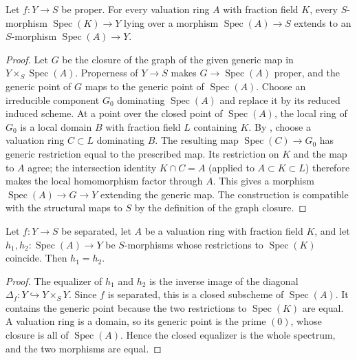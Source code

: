\begin{lemma}
  \label{lemma:nagata-proper-valuative-criterion-existence-api}

  Let $f\colon Y\to S$ be proper.  For every valuation ring $A$ with
  fraction field $K$, every $S$-morphism
  $\operatorname{Spec}(K)\to Y$ lying over a morphism
  $\operatorname{Spec}(A)\to S$ extends to an $S$-morphism
  $\operatorname{Spec}(A)\to Y$.
\end{lemma}

\begin{proof}
  Let $G$ be the closure of the graph of the given generic map in
  $Y\times_S\operatorname{Spec}(A)$.  Properness of $Y\to S$ makes
  $G\to\operatorname{Spec}(A)$ proper, and the generic point of $G$ maps to
  the generic point of $\operatorname{Spec}(A)$.  Choose an irreducible
  component $G_0$ dominating $\operatorname{Spec}(A)$ and replace it by its
  reduced induced scheme.  At a point over the closed point of
  $\operatorname{Spec}(A)$, the local ring of $G_0$ is a local domain $B$
  with fraction field $L$ containing $K$.  By
  , choose a valuation
  ring $C\subset L$ dominating $B$.  The resulting map
  $\operatorname{Spec}(C)\to G_0$ has generic restriction equal to the
  prescribed map.  Its restriction on $K$ and the map to $A$ agree; the
  intersection identity
  $K\cap C=A$ (applied to $A\subset K\subset L$) therefore makes the local
  homomorphism factor through $A$.  This gives a morphism
  $\operatorname{Spec}(A)\to G\to Y$ extending the generic map.  The
  construction is compatible with the structural maps to $S$ by the
  definition of the graph closure.
\end{proof}

\begin{lemma}
  \label{lemma:nagata-separated-valuation-lift-unique}

  Let $f\colon Y\to S$ be separated, let $A$ be a valuation ring with
  fraction field $K$, and let $h_1,h_2\colon\operatorname{Spec}(A)\to Y$ be
  $S$-morphisms whose restrictions to $\operatorname{Spec}(K)$ coincide.
  Then $h_1=h_2$.
\end{lemma}

\begin{proof}
  The equalizer of $h_1$ and $h_2$ is the inverse image of the diagonal
  $\Delta_f\colon Y\hookrightarrow Y\times_S Y$.  Since $f$ is separated,
  this is a closed subscheme of $\operatorname{Spec}(A)$.  It contains the
  generic point because the two restrictions to $\operatorname{Spec}(K)$ are
  equal.  A valuation ring is a domain, so its generic point is the prime
  $(0)$, whose closure is all of $\operatorname{Spec}(A)$.  Hence the closed
  equalizer is the whole spectrum, and the two morphisms are equal.
\end{proof}

